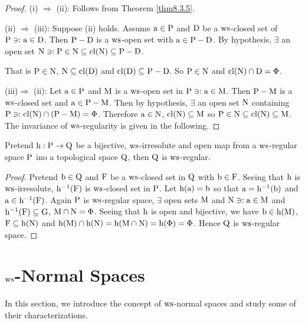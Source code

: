 \begin{proof}
(i) $\Rightarrow$ (ii): Follows from Theorem \ref{thm8.3.5}.

(ii) $\Rightarrow$ (iii): Suppose (ii) holds. Assume $\mathrm{a} \in \mathrm{P}$ and $\mathrm{D}$ be a $\mathrm{ws}$-closed set of $\mathrm{P} \ni: \mathrm{a} \in \mathrm{D}$. Then $\mathrm{P}-\mathrm{D}$ is a $\mathrm{ws}$-open set with $\mathrm{a} \in \mathrm{P}-\mathrm{D}$. By hypothesis, $\exists$ an open set $\mathrm{N} \ni: \mathrm{P} \in \mathrm{N} \subseteq \mathrm{cl}(\mathrm{N}) \subseteq \mathrm{P} -\mathrm{D}$.

That is $\mathrm{P} \in \mathrm{N}$, $\mathrm{N} \subseteq \mathrm{cl} (\mathrm{D})$ and $\mathrm{cl}(\mathrm{D}) \subseteq \mathrm{P} -\mathrm{D}$. So $\mathrm{P} \in \mathrm{N}$ and $\mathrm{cl}(\mathrm{N}) \cap \mathrm{D} = \Phi$.

(iii)$\Rightarrow$ (ii): Let $\mathrm{a} \in \mathrm{P}$ and $\mathrm{M}$ is a $\mathrm{ws}$-open set in $\mathrm{P} \ni: \mathrm{a} \in \mathrm{M}$. Then $\mathrm{P} -\mathrm{M}$ is a $\mathrm{ws}$-closed set and $\mathrm{a} \in \mathrm{P} -\mathrm{M}$. Then by hypothesis, $\exists$ an open set $\mathrm{N}$ containing $\mathrm{P} \ni: \mathrm{cl} (\mathrm{N}) \cap (\mathrm{P} -\mathrm{M}) = \Phi$. Therefore $\mathrm{a} \in \mathrm{N}$, $\mathrm{cl} (\mathrm{N}) \subseteq \mathrm{M}$ so $\mathrm{P} \in \mathrm{N} \subseteq \mathrm{cl}(\mathrm{N}) \subseteq \mathrm{M}$. The invariance of $\mathrm{ws}$-regularity is given in the following.
\end{proof}

\begin{thm}\label{thm8.3.10}
Pretend $\mathrm{h}: \mathrm{P} \to \mathrm{Q}$ be a bijective, $\mathrm{ws}$-irresolute and open map from a $\mathrm{ws}$-regular space $\mathrm{P}$ ino a topological space $\mathrm{Q}$, then $\mathrm{Q}$ is $\mathrm{ws}$-regular.
\end{thm}

\begin{proof}
Pretend $\mathrm{b} \in \mathrm{Q}$ and $\mathrm{F}$ be a $\mathrm{ws}$-closed set in $\mathrm{Q}$ with $\mathrm{b} \in \mathrm{F}$. Seeing that $\mathrm{h}$ is $\mathrm{ws}$-irresolute, $\mathrm{h}^{-1} (\mathrm{F})$ is $\mathrm{ws}$-closed set in $\mathrm{P}$. Let $\mathrm{h}(\mathrm{a}) = \mathrm{b}$ so that $\mathrm{a} = \mathrm{h}^{-1} (\mathrm{b})$ and $\mathrm{a} \in \mathrm{h}^{-1} (\mathrm{F})$. Again $\mathrm{P}$ is $\mathrm{ws}$-regular space, $\exists$ open sets $\mathrm{M}$ and $\mathrm{N} \ni: \mathrm{a} \in \mathrm{M}$ and $\mathrm{h}^{-1} (\mathrm{F}) \subseteq \mathrm{G}$, $\mathrm{M} \cap\mathrm{N} = \Phi$. Seeing that $\mathrm{h}$ is open and bijective, we have $\mathrm{b} \in \mathrm{h}(\mathrm{M})$, $\mathrm{F} \subseteq \mathrm{h}(\mathrm{N})$ and $\mathrm{h}(\mathrm{M}) \cap \mathrm{h}(\mathrm{N})= \mathrm{h}(\mathrm{M} \cap \mathrm{N}) = \mathrm{h}(\Phi) = \Phi$. Hence $\mathrm{Q}$ is $\mathrm{ws}$-regular space.
\end{proof}

\section{\boldmath$\mathrm{ws}$-Normal Spaces}

In this section, we introduce the concept of $\mathrm{ws}$-normal spaces and study some of their characterizations.

